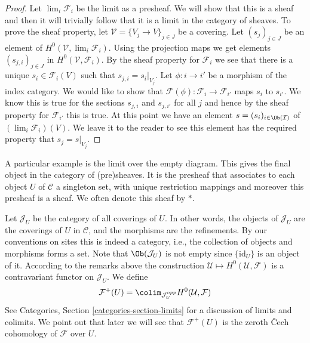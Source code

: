 \begin{proof}
Let $\lim_i \mathcal{F}_i$ be the limit as a presheaf.
We will show that this is a sheaf and then it will trivially follow
that it is a limit in the category of sheaves. To prove the sheaf
property, let $\mathcal{V} = \{V_j \to V\}_{j\in J}$ be a covering.
Let $(s_j)_{j\in J}$ be an element of $H^0(\mathcal{V}, \lim_i \mathcal{F}_i)$.
Using the projection maps we get elements $(s_{j, i})_{j\in J}$
in $H^0(\mathcal{V}, \mathcal{F}_i)$. By the sheaf property for
$\mathcal{F}_i$ we see that there is a unique $s_i \in \mathcal{F}_i(V)$
such that $s_{j, i} = s_i|_{V_j}$. Let $\phi : i \to i'$ be a morphism
of the index category. We would like to show that
$\mathcal{F}(\phi) : \mathcal{F}_i \to \mathcal{F}_{i'}$
maps $s_i$ to $s_{i'}$. We know this is true for the sections
$s_{j, i}$ and $s_{j, i'}$ for all $j$ and hence by the sheaf property
for $\mathcal{F}_{i'}$ this is true. At this point we have an
element $s = (s_i)_{i \in \Ob(\mathcal{I})}$ of
$(\lim_i \mathcal{F}_i)(V)$. We leave it to the reader to see
this element has the required property that $s_j = s|_{V_j}$.
\end{proof}

\begin{example}
\label{example-singleton-sheaf}
A particular example is the limit over the empty diagram.
This gives the final object in the category of (pre)sheaves.
It is the presheaf that associates
to each object $U$ of $\mathcal{C}$ a singleton set, with unique
restriction mappings and moreover this presheaf is a sheaf.
We often denote this sheaf by $*$.
\end{example}

\noindent
Let $\mathcal{J}_U$ be the category of all coverings of $U$.
In other words, the objects of $\mathcal{J}_U$ are the coverings
of $U$ in $\mathcal{C}$, and the morphisms are the refinements.
By our conventions on sites this is indeed a category, i.e.,
the collection of objects and morphisms forms a set.
Note that $\Ob(\mathcal{J}_U)$ is not empty since
$\{\text{id}_U\}$ is an object of it. According to the remarks
above the construction $\mathcal{U} \mapsto H^0(\mathcal{U}, \mathcal{F})$
is a contravariant functor on $\mathcal{J}_U$.
We define
$$
\mathcal{F}^{+}(U)
=
\colim_{\mathcal{J}_U^{opp}}
H^0(\mathcal{U}, \mathcal{F})
$$
See Categories, Section \ref{categories-section-limits} for
a discussion of limits and colimits. We point out that later
we will see that $\mathcal{F}^{+}(U)$ is the zeroth {\v C}ech
cohomology of $\mathcal{F}$ over $U$.

